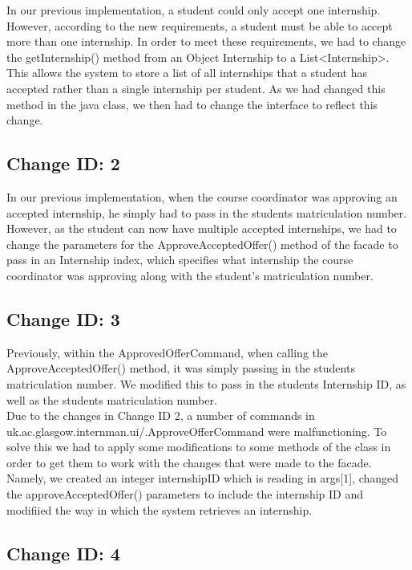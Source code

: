 \documentclass{l3deliverable}
\begin{document}
In our previous implementation, a student could only accept one internship. However, according to the new requirements, a student must be able to accept more than one internship. In order to meet these requirements, we had to change the getInternship() method from an Object Internship to a List<Internship>. This allows the system to store a list of all internships that a student has accepted rather than a single internship per student. As we had changed this method in the java class, we then had to change the interface to reflect this change.\\

\subsection{Change ID: 2}

In our previous implementation, when the course coordinator was approving an accepted internship, he simply had to pass in the students matriculation number. However, as the student can now have multiple accepted internships, we had to change the parameters for the ApproveAcceptedOffer() method of the facade to pass in an Internship index, which specifies what internship the course coordinator was approving along with the student's matriculation number.

\subsection{Change ID: 3}

Previously, within the ApprovedOfferCommand, when calling the ApproveAcceptedOffer() method, it was simply passing in the students matriculation number. We modified this to pass in the students Internship ID, as well as the students matriculation number. \\
Due to the changes in Change ID 2, a number of commands in uk.ac.glasgow.internman.ui/.ApproveOfferCommand were malfunctioning. To solve this we had to apply some modifications to some methods of the class in order to get them to work with the changes that were made to the facade. Namely, we created an integer internshipID which is reading in args[1], changed the approveAcceptedOffer() parameters to include the internship ID and modifiied the way in which the system retrieves an internship.\\


\subsection{Change ID: 4}
\end{document}
